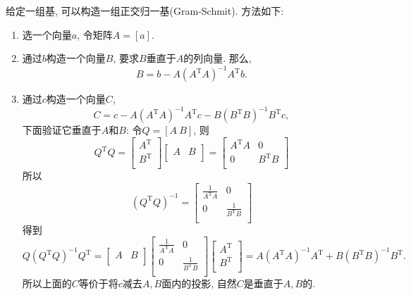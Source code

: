 给定一组基, 可以构造一组正交归一基(Gram-Schmit).
方法如下:
\begin{enumerate}
    \item 选一个向量$a$, 令矩阵$A = [a]$.
    
    \item 通过$b$构造一个向量$B$, 要求$B$垂直于$A$的列向量.
    那么,
    \begin{equation}
      B  = b - A \left( A^{\mathrm{T}}A \right) ^{-1} A^{\mathrm{T}} b.
    \end{equation}

    \item 通过$c$构造一个向量$C$,
    \begin{equation}
      C = c - A\left( A^{\mathrm{T}}A \right) ^{-1}A^{\mathrm{T}} c - B\left( B^{\mathrm{T}}B \right) ^{-1}B^{\mathrm{T}} c,
    \end{equation}
    下面验证它垂直于$A$和$B$:
    令$Q = [A\ B]$, 则
    \begin{equation}
      Q^{\mathrm{T}}Q  =\begin{bmatrix}
       A^{\mathrm{T}}\\
       B^{\mathrm{T}}\\
      \end{bmatrix}
      \begin{bmatrix}
       A & B\\
      \end{bmatrix}
      = \begin{bmatrix}
       A^{\mathrm{T}}A & 0\\
       0 & B^{\mathrm{T}}B\\
      \end{bmatrix}
    \end{equation}
    所以
    \begin{equation}
      \left( Q^{\mathrm{T}}Q \right) ^{-1} = \begin{bmatrix}
       \frac{1}{A^{\mathrm{T}}A} & 0\\
       0 & \frac{1}{B^{\mathrm{T}}B}\\
      \end{bmatrix}
    \end{equation}
    得到
    \begin{equation}
      Q\left( Q^{\mathrm{T}}Q \right) ^{-1}Q^{\mathrm{T}} =
      \begin{bmatrix}
       A & B\\
      \end{bmatrix}
      \begin{bmatrix}
       \frac{1}{A^{\mathrm{T}}A} & 0\\
       0 & \frac{1}{B^{\mathrm{T}}B}\\
      \end{bmatrix}
      \begin{bmatrix}
       A^{\mathrm{T}}\\
       B^{\mathrm{T}}\\
      \end{bmatrix}
      =
      A\left( A^{\mathrm{T}}A \right) ^{-1} A^{\mathrm{T}} + B \left( B^{\mathrm{T}}B \right) ^{-1} B^{\mathrm{T}}.
    \end{equation}
    所以上面的$C$等价于将$c$减去$A,B$面内的投影, 自然$C$是垂直于$A,B$的.


\end{enumerate}
